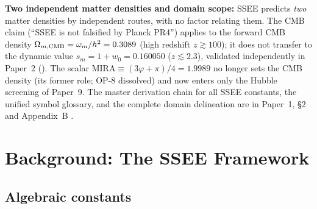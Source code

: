 \documentclass[12pt,a4paper]{article}
\begin{document}
\begin{abstract}
$\ell=220,\,536,\,813$ (Planck: $220,\,{\sim}540,\,{\sim}810$).
In a full posterior evaluation with the official off-diagonal \texttt{plik} TTTEEE
+ low-$\ell$ + lensing likelihood via Cobaya, sampling the $k=2=\{A_s,\tau\}$ SSEE
parameters (with $H_0$, $\omega_b$, $\omega_c$ and $n_s$ algebraically fixed) against
the $k=6$ $\Lambda$CDM baseline, the two models reach statistically indistinguishable
best fits ($\chi^2_{\rm SSEE}=2771.3$ vs.\ $\chi^2_{\Lambda\rm CDM}=2773.1$ over
$N=2354$ data points, $\Delta\chi^2_{\rm BF}=-1.8$), while the parameter-count economy
yields $\Delta\mathrm{BIC}=-32.9$, decisively favouring SSEE on the Jeffreys scale.
(A \texttt{plik\_lite} point-estimate cross-check gives a more conservative
$\Delta\mathrm{BIC}=-24.0$.) The $\Delta\mathrm{BIC}$ is driven by parsimony, not by
fit quality.
SSEE is not falsified by the Planck~PR4 CMB power spectra.
\end{abstract}

\noindent\textbf{Two independent matter densities and domain scope:}
SSEE predicts \emph{two} matter densities by independent routes, with no factor
relating them. The CMB claim (``SSEE is not falsified by Planck PR4'') applies to the
forward CMB density $\Omega_{m,\rm CMB}=\omega_m/h^2=0.3089$ (high redshift
$z\gtrsim 100$); it does not transfer to the dynamic value
$s_m=1+w_0=0.160050$ ($z\lesssim2.3$), validated independently in
Paper~2 (\citealt{AlmeidaSSEE2026a}). The scalar
$\mathrm{MIRA}\equiv(3\varphi+\pi)/4=1.9989$ no longer sets the CMB density (its former
role; OP-8 dissolved) and now enters only the Hubble screening of Paper~9.
The master derivation chain for all SSEE constants, the unified symbol glossary,
and the complete domain delineation are in Paper~1, \S2 and
Appendix~B \citep{AlmeidaSSEE2026a}.


\clearpage
{\small\tableofcontents}
\clearpage

\section{Background: The SSEE Framework}
\label{sec:framework}

\subsection{Algebraic constants}
\end{document}
